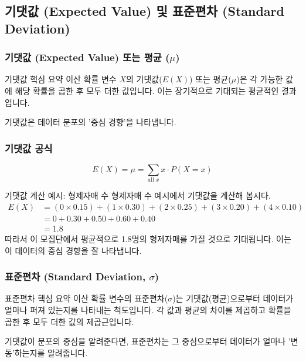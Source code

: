 \documentclass[11pt,a4paper]{article}
\theoremstyle{definition}
\begin{document}
\newpage
\subsection{기댓값 (Expected Value) 및 표준편차 (Standard Deviation)}

\subsubsection*{기댓값 (Expected Value) 또는 평균 (\(\mu\))}

\begin{summarybox}{기댓값 핵심 요약}
이산 확률 변수 \(X\)의 기댓값(\(E(X)\)) 또는 평균(\(\mu\))은 각 가능한 값에 해당 확률을 곱한 후 모두 더한 값입니다. 이는 장기적으로 기대되는 평균적인 결과입니다.
\end{summarybox}

기댓값은 데이터 분포의 '중심 경향'을 나타냅니다.

\subsubsection*{기댓값 공식}
\[ E(X) = \mu = \sum_{\text{all } x} x \cdot P(X=x) \]

\begin{examplebox}{기댓값 계산 예시: 형제자매 수}
형제자매 수 예시에서 기댓값을 계산해 봅시다.
\begin{align*} E(X) &= (0 \times 0.15) + (1 \times 0.30) + (2 \times 0.25) + (3 \times 0.20) + (4 \times 0.10) \\ &= 0 + 0.30 + 0.50 + 0.60 + 0.40 \\ &= 1.8 \end{align*}
따라서 이 모집단에서 평균적으로 1.8명의 형제자매를 가질 것으로 기대됩니다. 이는 이 데이터의 중심 경향을 잘 나타냅니다.
\end{examplebox}

\subsubsection*{표준편차 (Standard Deviation, \(\sigma\))}

\begin{summarybox}{표준편차 핵심 요약}
이산 확률 변수의 표준편차(\(\sigma\))는 기댓값(평균)으로부터 데이터가 얼마나 퍼져 있는지를 나타내는 척도입니다. 각 값과 평균의 차이를 제곱하고 확률을 곱한 후 모두 더한 값의 제곱근입니다.
\end{summarybox}

기댓값이 분포의 중심을 알려준다면, 표준편차는 그 중심으로부터 데이터가 얼마나 '변동'하는지를 알려줍니다.
\end{document}
